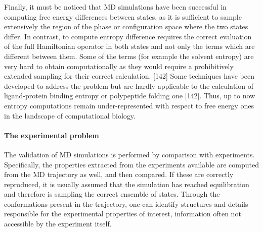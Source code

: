 Finally, it must be noticed that MD simulations have been successful in computing free energy differences between states, as it is sufficient to sample extensively the region of the phase or configuration space where the two states differ. In contrast, to compute entropy difference requires the correct evaluation of the full Hamiltonian operator in both states and not only the terms which are different between them. Some of the terms (for example the solvent entropy) are very hard to obtain computationally as they would require a prohibitively extended sampling for their correct calculation. [142]
%
Some techniques have been developed to address the problem but are hardly applicable to the calculation of ligand-protein binding entropy or polypeptide folding one [142]. Thus, up to now entropy computations remain under-represented with respect to free energy ones in the landscape of computational biology.


\paragraph{The experimental problem}

The validation of MD simulations is performed by comparison with experiments. Specifically, the properties extracted from the experiments available are computed from the MD trajectory as well, and then compared. If these are correctly reproduced, it is usually assumed that the simulation has reached equilibration and therefore is sampling the correct ensemble of states. Through the conformations present in the trajectory, one can identify structures and details responsible for the experimental properties of interest, information often not accessible by the experiment itself.

